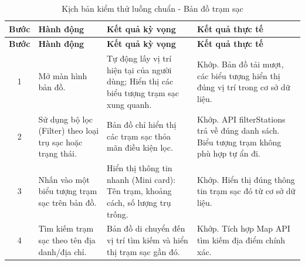 \begin{center}
    \renewcommand{\arraystretch}{1.5}
    \begin{longtable}{|c|>{\raggedright\arraybackslash}m{}|>{\raggedright\arraybackslash}m{}|>{\raggedright\arraybackslash}m{}|}
        \caption{Kịch bản kiểm thử luồng chuẩn - Bản đồ trạm sạc}
        \label{tab:map_happy} \\
        \hline
        \textbf{Bước} & \textbf{Hành động} & \textbf{Kết quả kỳ vọng} & \textbf{Kết quả thực tế} \\
        \hline
        \endfirsthead
        
        \hline
        \textbf{Bước} & \textbf{Hành động} & \textbf{Kết quả kỳ vọng} & \textbf{Kết quả thực tế} \\
        \hline
        \endhead
        
        1 & Mở màn hình bản đồ. & Tự động lấy vị trí hiện tại của người dùng; Hiển thị các biểu tượng trạm sạc xung quanh. & Khớp. Bản đồ tải mượt, các biểu tượng hiển thị đúng vị trí trong cơ sở dữ liệu. \\
        \hline
        2 & Sử dụng bộ lọc (Filter) theo loại trụ sạc hoặc trạng thái. & Bản đồ chỉ hiển thị các trạm sạc thỏa mãn điều kiện lọc. & Khớp. API filterStations trả về đúng danh sách. Biểu tượng trạm không phù hợp tự ẩn đi. \\
        \hline
        3 & Nhấn vào một biểu tượng trạm sạc trên bản đồ. & Hiển thị thông tin nhanh (Mini card): Tên trạm, khoảng cách, số lượng trụ trống. & Khớp. Hiển thị đúng thông tin trạm sạc đó từ cơ sở dữ liệu. \\
        \hline
        4 & Tìm kiếm trạm sạc theo tên địa danh/địa chỉ. & Bản đồ di chuyển đến vị trí tìm kiếm và hiển thị trạm sạc gần đó. & Khớp. Tích hợp Map API tìm kiếm địa điểm chính xác. \\
        \hline
    \end{longtable}
\end{center}

